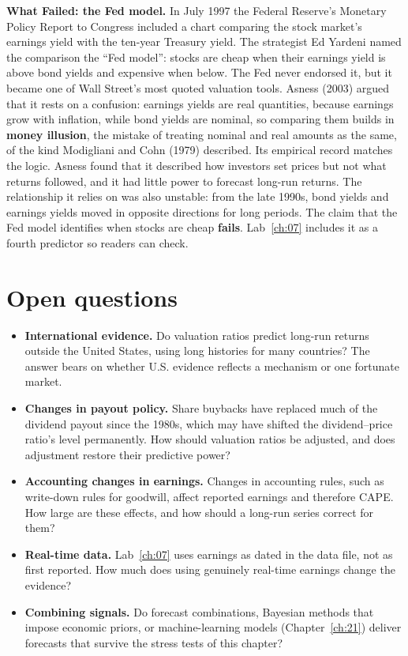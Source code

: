 \begin{callout}
\textbf{What Failed: the Fed model.} In July 1997 the Federal Reserve's Monetary Policy Report to Congress included a chart comparing the stock market's earnings yield with the ten-year Treasury yield. The strategist Ed Yardeni named the comparison the ``Fed model'': stocks are cheap when their earnings yield is above bond yields and expensive when below. The Fed never endorsed it, but it became one of Wall Street's most quoted valuation tools. Asness (2003) argued that it rests on a confusion: earnings yields are real quantities, because earnings grow with inflation, while bond yields are nominal, so comparing them builds in \textbf{money illusion}, the mistake of treating nominal and real amounts as the same, of the kind Modigliani and Cohn (1979) described. Its empirical record matches the logic. Asness found that it described how investors set prices but not what returns followed, and it had little power to forecast long-run returns. The relationship it relies on was also unstable: from the late 1990s, bond yields and earnings yields moved in opposite directions for long periods. The claim that the Fed model identifies when stocks are cheap \textbf{fails}. Lab~\ref{ch:07} includes it as a fourth predictor so readers can check.
\end{callout}

\section{Open questions}
\label{sec:07-open}

\begin{itemize}
  \item \textbf{International evidence.} Do valuation ratios predict long-run returns outside the United States, using long histories for many countries? The answer bears on whether U.S. evidence reflects a mechanism or one fortunate market.
  \item \textbf{Changes in payout policy.} Share buybacks have replaced much of the dividend payout since the 1980s, which may have shifted the dividend--price ratio's level permanently. How should valuation ratios be adjusted, and does adjustment restore their predictive power?
  \item \textbf{Accounting changes in earnings.} Changes in accounting rules, such as write-down rules for goodwill, affect reported earnings and therefore CAPE. How large are these effects, and how should a long-run series correct for them?
  \item \textbf{Real-time data.} Lab~\ref{ch:07} uses earnings as dated in the data file, not as first reported. How much does using genuinely real-time earnings change the evidence?
  \item \textbf{Combining signals.} Do forecast combinations, Bayesian methods that impose economic priors, or machine-learning models (Chapter~\ref{ch:21}) deliver forecasts that survive the stress tests of this chapter?
\end{itemize}

